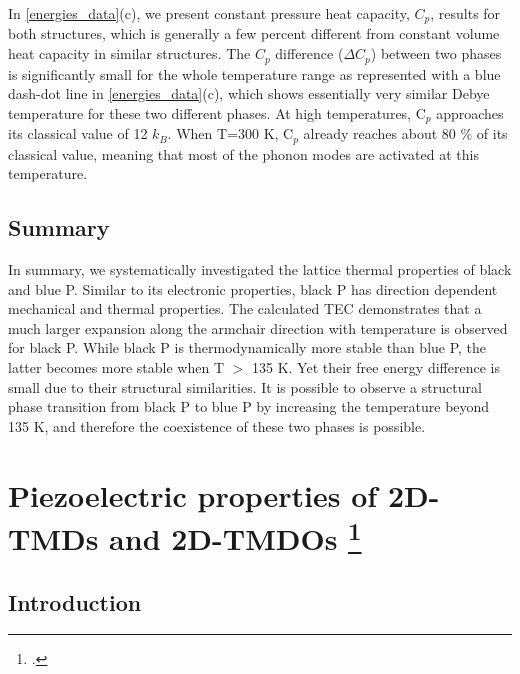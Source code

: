 In \autoref{energies_data}(c), we present constant pressure heat capacity, $C_p$, results for both structures, which is generally a few percent different from constant volume heat capacity in similar structures\cite{QHA1}. The $C_p$ difference ($\Delta C_p$) between two phases is significantly small for the whole temperature range as represented with a blue dash-dot line in \autoref{energies_data}(c), which shows essentially very similar Debye temperature for these two different phases.  At high temperatures, C$_p$ approaches its classical value of 12 $k_B$.  When T=300 K, C$_p$ already reaches about 80 $\%$ of its classical value, meaning that most of the phonon modes are activated at this temperature. 

\subsection{Summary}

In summary, we systematically investigated the lattice thermal properties of black and blue P. Similar to its electronic properties, black P has direction dependent mechanical and thermal properties. The calculated TEC demonstrates that a much larger expansion along the armchair direction with temperature is observed for black P. While black P is thermodynamically more stable than blue P, the latter becomes more stable when T $>$ 135 K. Yet their free energy difference is small due to their structural similarities. It is possible to observe a structural phase transition from black P to blue P by increasing the temperature beyond 135 K, and therefore the coexistence of these two phases is possible. 

\section[Piezoelectric properties of 2D-TMDs and 2D-TMDOs]{Piezoelectric properties of 2D-TMDs and 2D-TMDOs \footcite[This work is published:][]{Menderes2015} \label{piezo_mx2}}

\subsection{Introduction}

